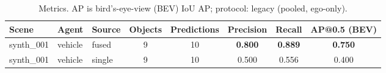 \begin{table}
\centering
\caption{Metrics. AP is bird's-eye-view (BEV) IoU AP; protocol: legacy (pooled, ego-only).}
\begin{tabular}{lll S[table-format=3.0] S[table-format=3.0] S[table-format=1.3,detect-weight] S[table-format=1.3,detect-weight] S[table-format=1.3,detect-weight]}
\toprule
{Scene} & {Agent} & {Source} & {Objects} & {Predictions} & {Precision} & {Recall} & {AP@0.5 (BEV)} \\
\midrule
{synth\_001} & {vehicle} & {fused} & 9 & 10 & \bfseries 0.800 & \bfseries 0.889 & \bfseries 0.750 \\
{synth\_001} & {vehicle} & {single} & 9 & 10 & 0.500 & 0.556 & 0.400 \\
\bottomrule
\end{tabular}
\end{table}
